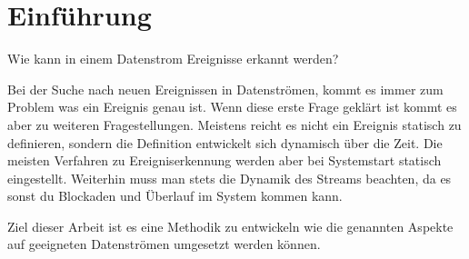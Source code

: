 \section{Einführung}

Wie kann in einem Datenstrom Ereignisse erkannt werden?


Bei der Suche nach neuen Ereignissen in Datenströmen, kommt es immer zum Problem was ein Ereignis genau ist. Wenn diese erste Frage geklärt ist kommt es aber zu weiteren Fragestellungen. Meistens reicht es nicht ein Ereignis statisch zu definieren, sondern die Definition entwickelt sich dynamisch über die Zeit. Die meisten Verfahren zu Ereigniserkennung werden aber bei Systemstart statisch eingestellt. Weiterhin muss man stets die Dynamik des Streams beachten, da es sonst du Blockaden und Überlauf im System kommen kann.

Ziel dieser Arbeit ist es eine Methodik zu entwickeln wie die genannten Aspekte auf geeigneten Datenströmen umgesetzt werden können.

